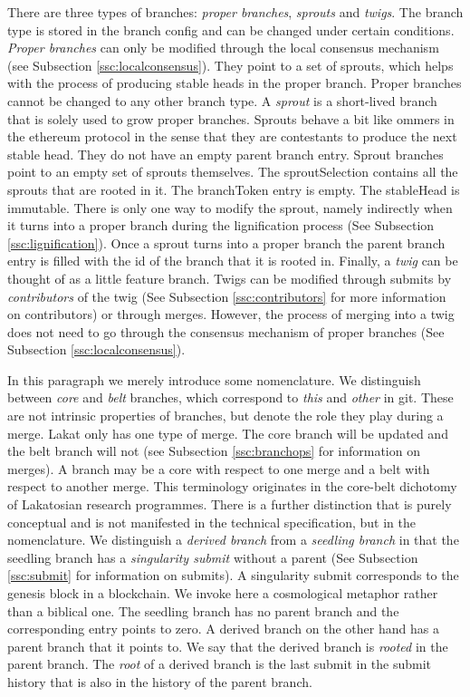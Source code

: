 There are three types of branches: \textit{proper branches}, \textit{sprouts} and \textit{twigs}. The branch type is stored in the branch config and can be changed under certain conditions. 
\textit{Proper branches} can only be modified through the local consensus mechanism (see Subsection \ref{ssc:localconsensus}). They point to a set of sprouts, which helps with the process of producing stable heads in the proper branch. Proper branches cannot be changed to any other branch type. A \textit{sprout} is a short-lived branch that is solely used to grow proper branches. Sprouts behave a bit like ommers in the ethereum protocol in the sense that they are contestants to produce the next stable head. They do not have an empty parent branch entry. Sprout branches point to an empty set of sprouts themselves. The sproutSelection contains all the sprouts that are rooted in it. The branchToken entry is empty. The stableHead is immutable. There is only one way to modify the sprout, namely indirectly when it turns into a proper branch during the lignification process (See Subsection \ref{ssc:lignification}). Once a sprout turns into a proper branch the parent branch entry is filled with the id of the branch that it is rooted in. Finally, a \textit{twig} can be thought of as a little feature branch. Twigs can be modified through submits by \textit{contributors} of the twig (See Subsection \ref{ssc:contributors} for more information on contributors) or through merges. However, the process of merging into a twig does not need to go through the consensus mechanism of proper branches (See Subsection \ref{ssc:localconsensus}).

In this paragraph we merely introduce some nomenclature. We distinguish between \textit{core} and \textit{belt} branches, which correspond to \textit{this} and \textit{other} in git. These are not intrinsic properties of branches, but denote the role they play during a merge. Lakat only has one type of merge. The core branch will be updated and the belt branch will not (see Subsection \ref{ssc:branchops} for information on merges). A branch may be a core with respect to one merge and a belt with respect to another merge. This terminology originates in the core-belt dichotomy of Lakatosian research programmes. There is a further distinction that is purely conceptual and is not manifested in the technical specification, but in the nomenclature. We distinguish a \textit{derived branch} from a \textit{seedling branch} in that the seedling branch has a \textit{singularity submit} without a parent (See Subsection \ref{ssc:submit} for information on submits). A singularity submit corresponds to the genesis block in a blockchain. We invoke here a cosmological metaphor rather than a biblical one. The seedling branch has no parent branch and the corresponding entry points to zero. A derived branch on the other hand has a parent branch that it points to. We say that the derived branch is \textit{rooted} in the parent branch. The \textit{root} of a derived branch is the last submit in the submit history that is also in the history of the parent branch.


